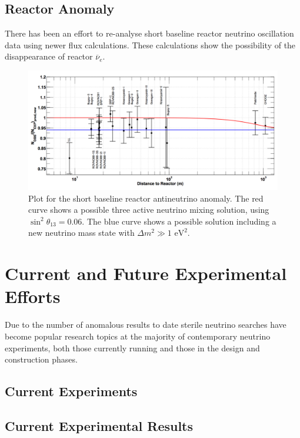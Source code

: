 \documentclass[aps,prd,twocolumn,nofootinbib]{revtex4-1}
\begin{document}
\subsection{Reactor Anomaly}
There has been an effort to re-analyse short baseline reactor neutrino oscillation data using newer flux calculations. These calculations show the possibility of the disappearance of reactor $\overline{\nu}_e$.
\begin{figure}[H]
  \centering
  \includegraphics[width=1\columnwidth]{../figures/reactor_anom.png}
  \caption{Plot for the short baseline reactor antineutrino anomaly. The red curve shows a possible three active neutrino mixing solution, using $\sin^2\theta_{13} = 0.06$. The blue curve shows a possible solution including a new neutrino mass state with $\Delta m^2 \gg 1\text{ eV}^2$.}
\end{figure}

\section{Current and Future Experimental Efforts}
Due to the number of anomalous results to date sterile neutrino searches have become popular research topics at the majority of contemporary neutrino experiments, both those currently running and those in the design and construction phases.

\subsection{Current Experiments}

\subsection{Current Experimental Results}
\end{document}
